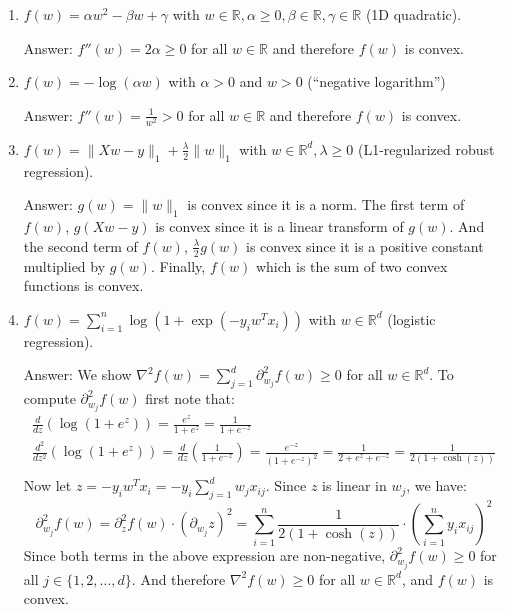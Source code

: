 \documentclass{article}
\newenvironment{answer}{\par\begingroup\color{gre}Answer: }{\endgroup}
\def\R{\mathbb{R}}
\newcommand{\norm}[1]{\lVert #1 \rVert}
\begin{document}
\begin{enumerate}
\item $f(w) = \alpha w^2 - \beta w + \gamma$ with $w \in \R, \alpha \geq 0, \beta \in \R, \gamma \in \R$ (1D quadratic).
\begin{answer}
    $f''(w) = 2 \alpha \geq 0$ for all $w\in \mathbb{R}$ and therefore $f(w)$ is convex.
\end{answer}

\item $f(w) = -\log(\alpha w) $ with $\alpha > 0$ and $w > 0$ (``negative logarithm'')
\begin{answer}
    $f''(w) = \frac{1}{w^2} > 0$ for all $w\in \mathbb{R}$ and therefore $f(w)$ is convex.
\end{answer}

\item $f(w) = \norm{Xw-y}_1 + \frac{\lambda}{2}\norm{w}_1$ with $w \in \R^d, \lambda \geq 0$ (L1-regularized robust regression).
\begin{answer}
    $g(w)=\norm{w}_1$ is convex since it is a norm. The first term of $f(w)$, $g(Xw - y)$ is convex since it is a linear transform of $g(w)$. And the second term of $f(w)$, $\frac{\lambda}{2} g(w)$ is convex since it is a positive constant multiplied by $g(w)$. Finally, $f(w)$ which is the sum of two convex functions is convex.
\end{answer}

\item $f(w) = \sum_{i=1}^n \log(1+\exp(-y_iw^Tx_i)) $ with $w \in \R^d$ (logistic regression).
\begin{answer}
    We show $\nabla^2 f(w) = \sum_{j=1}^{d} \partial^2_{w_j} f(w) \geq 0$ for all $w \in \R^d$. To compute $\partial^2_{w_j} f(w)$ first note that:
    \begin{gather*}
        \frac{d}{dz} \left( \log(1 + e^z) \right) = \frac{e^z}{1 + e^z} = \frac{1}{1+e^{-z}}\\
        \frac{d^2}{dz^2} \left( \log(1 + e^z) \right) = \frac{d}{dz} \left( \frac{1}{1+e^{-z}} \right) = \frac{e^{-z}}{\left( 1+e^{-z} \right)^2} = \frac{1}{2 + e^z + e^{-z}} = \frac{1}{2\left( 1 + \cosh\left( z \right) \right)}\\
    \end{gather*}
    Now let $z = -y_iw^Tx_i = -y_i \sum_{j=1}^{d} w_j x_{ij}$. Since $z$ is linear in $w_j$, we have:
    \[\partial^2_{w_j} f(w) = \partial^2_{z} f(w) \cdot (\partial_{w_j} z)^2 = \sum_{i=1}^{n} \frac{1}{2\left( 1 + \cosh\left( z \right) \right)} \cdot \left( \sum_{i=1}^{n} y_i x_{ij} \right)^2\]
    Since both terms in the above expression are non-negative, $\partial^2_{w_j} f(w) \geq 0$ for all $j\in \{1, 2, \dots, d\}$. And therefore $\nabla^2 f(w) \geq 0$ for all $w \in \R^d$, and $f(w)$ is convex.
\end{answer}


\end{enumerate}
\end{document}
